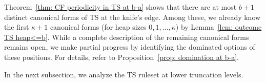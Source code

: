 \documentclass[oneside,reqno]{amsart}
\newcommand{\ur}[1]{\textcolor{blue}{#1}}
\newcommand{\ts}{\mathcal{T}}
\newcommand{\lp}{\mathscr{L}}
\begin{document}
    

Theorem~\ref{thm: CF periodicity in TS at b-a} shows that there are at most $b+1$ distinct canonical forms of {\sc TS} at the knife's edge. Among these, we already know the first ${\kappa}+1$ canonical forms (for heap sizes $0,1,\dots,{\kappa}$) by Lemma~\ref{lem: outcome TS heap<=b}. While a complete description of the remaining canonical forms remains open, we make partial progress by identifying the dominated options of these positions. For details, refer to Proposition~\ref{prop: domination at b-a}. %




In the next subsection, we analyze the {\sc TS} ruleset at lower truncation levels.
\end{document}
